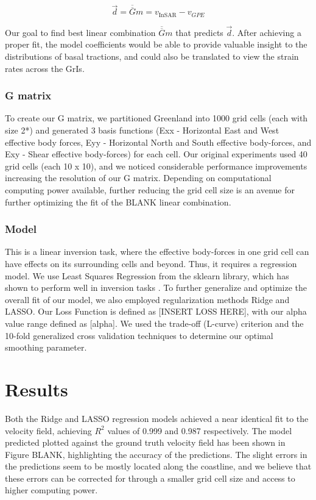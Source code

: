 \documentclass{article}
\begin{document}
$$
\vec{d}=\overline{\overline{G}} m=v_{\text {InSAR}}-v_{GPE}
$$

Our goal to find best linear combination $\overline{\overline{G}} m$ that predicts $\vec{d}$. After achieving a proper fit, the model coefficients would be able to provide valuable insight to the distributions of basal tractions, and could also be translated to view the strain rates across the GrIs.

\subsubsection{G matrix}
To create our G matrix, we partitioned Greenland into 1000 grid cells (each with size 2*) and generated 3 basis functions (Exx - Horizontal East and West effective body forces, Eyy - Horizontal North and South effective body-forces, and Exy - Shear effective body-forces) for each cell. Our original experiments used 40 grid cells (each 10 x 10), and we noticed considerable performance improvements increasing the resolution of our G matrix. Depending on computational computing power available, further reducing the grid cell size is an avenue for further optimizing the fit of the BLANK linear combination.   

\subsubsection{Model}

This is a linear inversion task, where the effective body-forces in one grid cell can have effects on its surrounding cells and beyond. Thus, it requires a regression model. We use Least Squares Regression from the sklearn library, which has shown to perform well in inversion tasks \cite{lines_review_1984}. To further generalize and optimize the overall fit of our model, we also employed regularization methods Ridge and LASSO. Our Loss Function is defined as [INSERT LOSS HERE], with our alpha value range defined as [alpha]. We used the trade-off (L-curve) criterion and the 10-fold generalized cross validation techniques to determine our optimal smoothing parameter. 

\section{Results}

Both the Ridge and LASSO regression models achieved a near identical fit to the velocity field, achieving $R^{2}$ values of 0.999 and 0.987 respectively. The model predicted plotted against the ground truth velocity field has been shown in Figure BLANK, highlighting the accuracy of the predictions. The slight errors in the predictions seem to be mostly located along the coastline, and we believe that these errors can be corrected for through a smaller grid cell size and access to higher computing power. 
\end{document}
